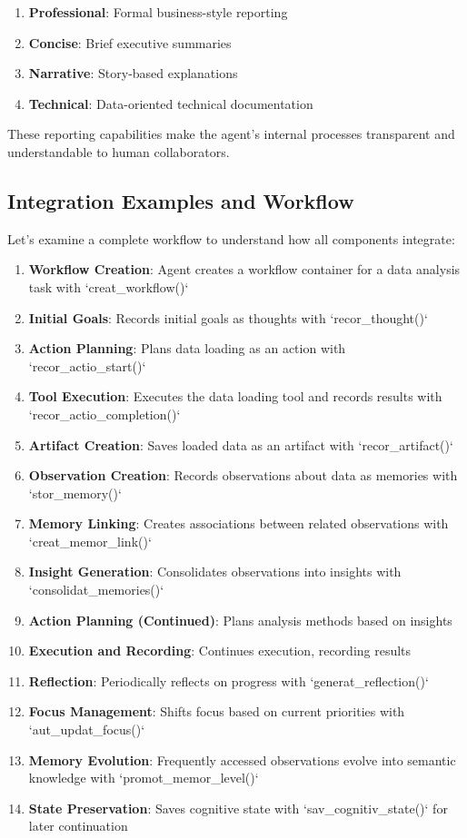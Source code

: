 \documentclass[12pt,a4paper]{article}
\begin{document}
\begin{enumerate}[label=\arabic*.]
    \item \textbf{Professional}: Formal business-style reporting
    \item \textbf{Concise}: Brief executive summaries
    \item \textbf{Narrative}: Story-based explanations
    \item \textbf{Technical}: Data-oriented technical documentation
\end{enumerate}

These reporting capabilities make the agent's internal processes transparent and understandable to human collaborators.

\subsection*{Integration Examples and Workflow}

Let's examine a complete workflow to understand how all components integrate:

\begin{enumerate}[label=\arabic*.]
    \item \textbf{Workflow Creation}: Agent creates a workflow container for a data analysis task with `creat\1\_workflow()`
    \item \textbf{Initial Goals}: Records initial goals as thoughts with `recor\1\_thought()`
    \item \textbf{Action Planning}: Plans data loading as an action with `recor\1\_actio\1\_start()`
    \item \textbf{Tool Execution}: Executes the data loading tool and records results with `recor\1\_actio\1\_completion()`
    \item \textbf{Artifact Creation}: Saves loaded data as an artifact with `recor\1\_artifact()`
    \item \textbf{Observation Creation}: Records observations about data as memories with `stor\1\_memory()`
    \item \textbf{Memory Linking}: Creates associations between related observations with `creat\1\_memor\1\_link()`
    \item \textbf{Insight Generation}: Consolidates observations into insights with `consolidat\1\_memories()`
    \item \textbf{Action Planning (Continued)}: Plans analysis methods based on insights
    \item \textbf{Execution and Recording}: Continues execution, recording results
    \item \textbf{Reflection}: Periodically reflects on progress with `generat\1\_reflection()`
    \item \textbf{Focus Management}: Shifts focus based on current priorities with `aut\1\_updat\1\_focus()`
    \item \textbf{Memory Evolution}: Frequently accessed observations evolve into semantic knowledge with `promot\1\_memor\1\_level()`
    \item \textbf{State Preservation}: Saves cognitive state with `sav\1\_cognitiv\1\_state()` for later continuation
\end{enumerate}
\end{document}
